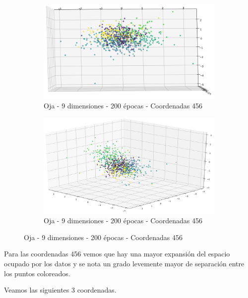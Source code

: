 \begin{figure}[!htbp]
\centering
\begin{subfigure}{.5\textwidth}
  \centering
  \includegraphics[width=1\linewidth, scale=1]{../img/ej1/oja_corrida_200_9/oja_9salida_200ep_testing_dim456_3.png}
  \caption{Oja - 9 dimensiones - 200 épocas - Coordenadas 456}
  \label{fig:sub1}
\end{subfigure}%
\begin{subfigure}{.5\textwidth}
  \centering
  \includegraphics[width=1\linewidth, scale=1]{../img/ej1/oja_corrida_200_9/oja_9salida_200ep_testing_dim456_4.png}
  \caption{Oja - 9 dimensiones - 200 épocas - Coordenadas 456}
  \label{fig:sub2}
\end{subfigure}
\end{figure}

Para las coordenadas 456 vemos que hay una mayor expansión del espacio ocupado por los datos y se nota un grado levemente mayor de separación entre
los puntos coloreados.

Veamos las siguientes 3 coordenadas.

